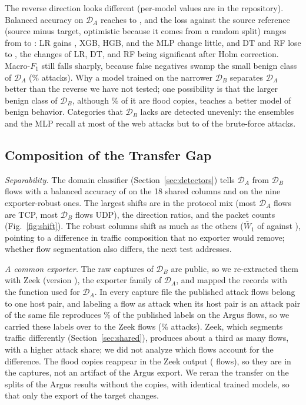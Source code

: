 \documentclass{ieeeaccess}
\newcommand{\DA}{\ensuremath{\mathcal{D}_{A}}}
\newcommand{\DB}{\ensuremath{\mathcal{D}_{B}}}
\begin{document}
The reverse direction looks different (per-model values are in the repository). Balanced accuracy on \DA{} reaches \TrRevTgtBAmin{} to \TrRevTgtBAmax{}, and the loss against the source reference (source minus target, optimistic because it comes from a random split) ranges from \TrRevBAdropMin{} to \TrRevBAdropMax{}: LR gains \TrRevLRgain{}, XGB, HGB, and the MLP change little, and DT and RF lose \TrRevTreeLossMin{} to \TrRevTreeLossMax{}, the changes of LR, DT, and RF being significant after Holm correction. Macro-$F_1$ still falls sharply, because false negatives swamp the small benign class of \DA{} (\PrevDa\% attacks). Why a model trained on the narrower \DB{} separates \DA{} better than the reverse we have not tested; one possibility is that the larger benign class of \DB{}, although \LcBenignTwinPct\% of it are flood copies, teaches a better model of benign behavior. Categories that \DB{} lacks are detected unevenly: the ensembles and the MLP recall at most \RevWebEnsMax{} of the web attacks but \RevBFmin{} to \RevBFmax{} of the brute-force attacks.

\subsection{Composition of the Transfer Gap}
\label{sec:res:anatomy}

\emph{Separability.} The domain classifier (Section~\ref{sec:detectors}) tells \DA{} from \DB{} flows with a balanced accuracy of \DomShared{} on the 18 shared columns and \DomRobust{} on the nine exporter-robust ones. The largest shifts are in the protocol mix (most \DA{} flows are TCP, most \DB{} flows UDP), the direction ratios, and the packet counts (Fig.~\ref{fig:shift}). The robust columns shift as much as the others ($\bar{W}_1$ of \WoneRobust{} against \WoneNonrobust), pointing to a difference in traffic composition that no exporter would remove; whether flow segmentation also differs, the next test addresses.

\emph{A common exporter.} The raw captures of \DB{} are public, so we re-extracted them with Zeek (version \ZkVersion{}), the exporter family of \DA{}, and mapped the records with the function used for \DA{}. In every capture file the published attack flows belong to one host pair, and labeling a flow as attack when its host pair is an attack pair of the same file reproduces \ZkRuleAgreePct\% of the published labels on the Argus flows, so we carried these labels over to the \ZkFlows{} Zeek flows (\ZkAttackPct\% attacks). Zeek, which segments traffic differently (Section~\ref{sec:shared}), produces about a third as many flows, with a higher attack share; we did not analyze which flows account for the difference. The flood copies reappear in the Zeek output (\ZkCopies{} flows), so they are in the captures, not an artifact of the Argus export. We reran the transfer on the \ZkSeeds{} splits of the Argus results without the copies, with identical trained models, so that only the export of the target changes.
\end{document}
